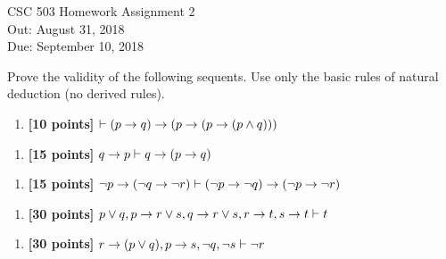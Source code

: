 \documentclass{article}
\begin{document}
\begin{center}
  {\LARGE CSC 503 Homework Assignment 2}\\[1pc]
  Out: August 31, 2018 \\
  Due: September 10, 2018 \\
\end{center}


Prove the validity of the following sequents.  Use only the basic
rules of natural deduction (no derived rules).

\begin{enumerate}
\item[1.] \textbf{[10 points]}
  $\vdash (p \rightarrow q) \rightarrow (p \rightarrow (p \rightarrow (p \land
  q)))$
\end{enumerate}

\begin{enumerate}
\item[2.] \textbf{[15 points]}
  $q \rightarrow p \vdash q \rightarrow (p \rightarrow q)$
\end{enumerate}
  
\begin{enumerate}
\item[3.] \textbf{[15 points]}
  $ \neg p \rightarrow (\neg q \rightarrow \neg r) \vdash (\neg p \rightarrow
  \neg q) \rightarrow (\neg p \rightarrow \neg r)$
\end{enumerate}
  
\begin{enumerate}
\item[4.] \textbf{[30 points]}
  $p \lor q, p \rightarrow r \lor s, q \rightarrow r \lor s, r \rightarrow t, s
  \rightarrow t \vdash t$
\end{enumerate}

\begin{enumerate}
\item[5.] \textbf{[30 points]}
  $r \rightarrow (p \lor q), p \rightarrow s, \neg q, \neg s \vdash \neg r$
\end{enumerate}
\end{document}

